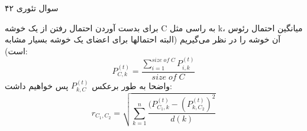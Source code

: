 سوال تئوری ۴۲

برای بدست آوردن احتمال رفتن از یک خوشه C به راسی مثل k، میانگین احتمال رئوس آن خوشه را در نظر می‌گیریم (البته احتمالها برای اعضای یک خوشه بسیار مشابه است):
$$
P^{(t)}_{C,k} = \frac{\sum_{i=1}^{size\;of\;C}P^{(t)}_{i,k}}{size\;of\;C}
$$
واضحا به طور برعکس $P^{(t)}_{k,C}$
پس خواهیم داشت:
$$
r_{C_1,C_2} = \sqrt{\sum^n_{k=1}\frac{(P^{(t)}_{C_1,k} - (P^{(t)}_{k,C_2})^2}{d(k)}}
$$